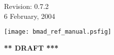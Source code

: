 \thispagestyle{empty}

\begin{flushright}
\large
  Revision: 0.7.2 \\
  6 February, 2004 \\
\end{flushright}

\vfill

{
\begin{center}
\texttt{[image: bmad\_ref\_manual.psfig]} \\
\end{center}
}

\vskip 1in
\begin{center}
{\Huge \bf *** DRAFT ***}
\end{center}
\vfill
\break